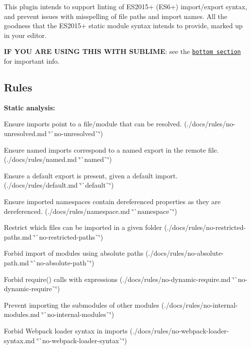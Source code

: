 \href{https://travis-ci.org/benmosher/eslint-plugin-import}{\tt } \href{https://coveralls.io/github/benmosher/eslint-plugin-import?branch=master}{\tt } \href{https://ci.appveyor.com/project/benmosher/eslint-plugin-import/branch/master}{\tt } \href{https://www.npmjs.com/package/eslint-plugin-import}{\tt } \href{http://www.npmtrends.com/eslint-plugin-import}{\tt }

This plugin intends to support linting of E\+S2015+ (E\+S6+) import/export syntax, and prevent issues with misspelling of file paths and import names. All the goodness that the E\+S2015+ static module syntax intends to provide, marked up in your editor.

{\bfseries IF Y\+OU A\+RE U\+S\+I\+NG T\+H\+IS W\+I\+TH S\+U\+B\+L\+I\+ME}\+: see the \href{#sublimelinter-eslint}{\tt bottom section} for important info.

\subsection*{Rules}

{\bfseries Static analysis\+:}


\begin{DoxyItemize}
\item Ensure imports point to a file/module that can be resolved. (./docs/rules/no-\/unresolved.md \char`\"{}\`{}no-\/unresolved\`{}\char`\"{})
\item Ensure named imports correspond to a named export in the remote file. (./docs/rules/named.md \char`\"{}\`{}named\`{}\char`\"{})
\item Ensure a default export is present, given a default import. (./docs/rules/default.md \char`\"{}\`{}default\`{}\char`\"{})
\item Ensure imported namespaces contain dereferenced properties as they are dereferenced. (./docs/rules/namespace.md \char`\"{}\`{}namespace\`{}\char`\"{})
\item Restrict which files can be imported in a given folder (./docs/rules/no-\/restricted-\/paths.md \char`\"{}\`{}no-\/restricted-\/paths\`{}\char`\"{})
\item Forbid import of modules using absolute paths (./docs/rules/no-\/absolute-\/path.md \char`\"{}\`{}no-\/absolute-\/path\`{}\char`\"{})
\item Forbid {\ttfamily require()} calls with expressions (./docs/rules/no-\/dynamic-\/require.md \char`\"{}\`{}no-\/dynamic-\/require\`{}\char`\"{})
\item Prevent importing the submodules of other modules (./docs/rules/no-\/internal-\/modules.md \char`\"{}\`{}no-\/internal-\/modules\`{}\char`\"{})
\item Forbid Webpack loader syntax in imports (./docs/rules/no-\/webpack-\/loader-\/syntax.md \char`\"{}\`{}no-\/webpack-\/loader-\/syntax\`{}\char`\"{})
\end{DoxyItemize}

